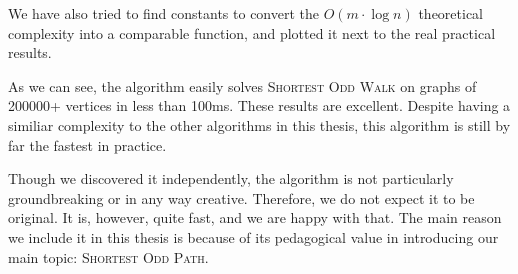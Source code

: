 We have also tried to find constants to convert the $O(m \cdot \log n)$ theoretical complexity into a comparable function, and plotted it next to the real practical results.

\begin{center}
        
\end{center}

As we can see, the algorithm easily solves \textsc{Shortest Odd Walk} on graphs of 200000+ vertices in less than 100ms. These results are excellent. Despite having a similiar complexity to the other algorithms in this thesis, this algorithm is still by far the fastest in practice.

Though we discovered it independently, the algorithm is not particularly groundbreaking or in any way creative. Therefore, we do not expect it to be original. It is, however, quite fast, and we are happy with that. The main reason we include it in this thesis is because of its pedagogical value in introducing our main topic: \textsc{Shortest Odd Path}. 
